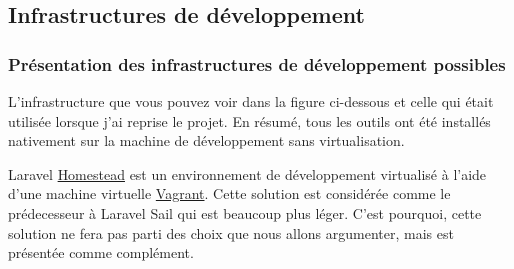 \documentclass[
    iai, %
    il, %
]{heig-tb}
\begin{document}
\subsection{Infrastructures de développement}

\subsubsection{Présentation des infrastructures de développement possibles}
L'infrastructure que vous pouvez voir dans la figure ci-dessous et celle qui était utilisée lorsque j'ai reprise le projet.\newline
En résumé, tous les outils ont été installés nativement sur la machine de développement sans virtualisation. %
{}



Laravel \href{https://laravel.com/docs/9.x/homestead}{Homestead} est un environnement de développement virtualisé à l'aide d'une machine virtuelle \href{https://www.vagrantup.com/}{Vagrant}.
Cette solution est considérée comme le prédecesseur à Laravel Sail qui est beaucoup plus léger.
C'est pourquoi, cette solution ne fera pas parti des choix que nous allons argumenter, mais est présentée comme complément.



\clearpage
\end{document}
